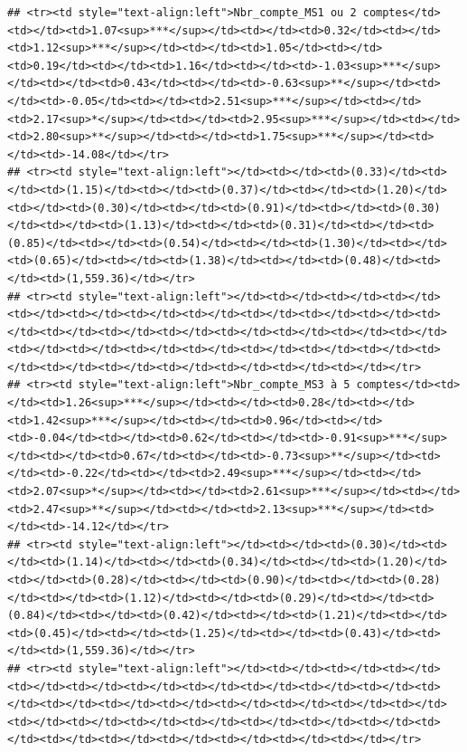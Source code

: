 \documentclass[
]{article}
\begin{document}
\begin{verbatim}
## <tr><td style="text-align:left">Nbr_compte_MS1 ou 2 comptes</td><td></td><td>1.07<sup>***</sup></td><td></td><td>0.32</td><td></td><td>1.12<sup>***</sup></td><td></td><td>1.05</td><td></td><td>0.19</td><td></td><td>1.16</td><td></td><td>-1.03<sup>***</sup></td><td></td><td>0.43</td><td></td><td>-0.63<sup>**</sup></td><td></td><td>-0.05</td><td></td><td>2.51<sup>***</sup></td><td></td><td>2.17<sup>*</sup></td><td></td><td>2.95<sup>***</sup></td><td></td><td>2.80<sup>**</sup></td><td></td><td>1.75<sup>***</sup></td><td></td><td>-14.08</td></tr>
## <tr><td style="text-align:left"></td><td></td><td>(0.33)</td><td></td><td>(1.15)</td><td></td><td>(0.37)</td><td></td><td>(1.20)</td><td></td><td>(0.30)</td><td></td><td>(0.91)</td><td></td><td>(0.30)</td><td></td><td>(1.13)</td><td></td><td>(0.31)</td><td></td><td>(0.85)</td><td></td><td>(0.54)</td><td></td><td>(1.30)</td><td></td><td>(0.65)</td><td></td><td>(1.38)</td><td></td><td>(0.48)</td><td></td><td>(1,559.36)</td></tr>
## <tr><td style="text-align:left"></td><td></td><td></td><td></td><td></td><td></td><td></td><td></td><td></td><td></td><td></td><td></td><td></td><td></td><td></td><td></td><td></td><td></td><td></td><td></td><td></td><td></td><td></td><td></td><td></td><td></td><td></td><td></td><td></td><td></td><td></td><td></td><td></td></tr>
## <tr><td style="text-align:left">Nbr_compte_MS3 à 5 comptes</td><td></td><td>1.26<sup>***</sup></td><td></td><td>0.28</td><td></td><td>1.42<sup>***</sup></td><td></td><td>0.96</td><td></td><td>-0.04</td><td></td><td>0.62</td><td></td><td>-0.91<sup>***</sup></td><td></td><td>0.67</td><td></td><td>-0.73<sup>**</sup></td><td></td><td>-0.22</td><td></td><td>2.49<sup>***</sup></td><td></td><td>2.07<sup>*</sup></td><td></td><td>2.61<sup>***</sup></td><td></td><td>2.47<sup>**</sup></td><td></td><td>2.13<sup>***</sup></td><td></td><td>-14.12</td></tr>
## <tr><td style="text-align:left"></td><td></td><td>(0.30)</td><td></td><td>(1.14)</td><td></td><td>(0.34)</td><td></td><td>(1.20)</td><td></td><td>(0.28)</td><td></td><td>(0.90)</td><td></td><td>(0.28)</td><td></td><td>(1.12)</td><td></td><td>(0.29)</td><td></td><td>(0.84)</td><td></td><td>(0.42)</td><td></td><td>(1.21)</td><td></td><td>(0.45)</td><td></td><td>(1.25)</td><td></td><td>(0.43)</td><td></td><td>(1,559.36)</td></tr>
## <tr><td style="text-align:left"></td><td></td><td></td><td></td><td></td><td></td><td></td><td></td><td></td><td></td><td></td><td></td><td></td><td></td><td></td><td></td><td></td><td></td><td></td><td></td><td></td><td></td><td></td><td></td><td></td><td></td><td></td><td></td><td></td><td></td><td></td><td></td><td></td></tr>

\end{verbatim}
\end{document}
